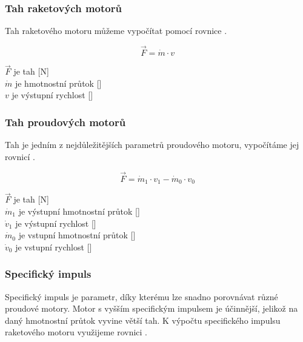\subsubsection{Tah raketových motorů}
{Tah raketového motoru můžeme vypočítat pomocí rovnice .}
\cite{NASA:propulsionIndex}

\begin{equation}\label{rv:RaketovyMotorTah}
    \vec{F}=\dot{m}\cdot{v}
\end{equation}

{\(\vec{F}\) je tah [N]}\\
{\(\dot{m}\) je hmotnostní průtok [\kgs]}\\
{\(v\) je výstupní rychlost [\ms]}\\

\subsubsection{Tah proudových motorů}
{Tah je jedním z nejdůležitějších parametrů proudového motoru, vypočítáme jej rovnicí .}
\cite{NASA:propulsionIndex}

\begin{equation}\label{rv:ProudovyMotorTah}
    \vec{F}=\dot{m}_{1}\cdot{v_1}-\dot{m}_{0}\cdot{v_0}
\end{equation}

{\(\vec{F}\) je tah [N]}\\
{\(\dot{m}_{1}\) je výstupní hmotnostní průtok [\kgs]}\\
{\(\dot{v}_{1}\) je výstupní rychlost [\ms]}\\
{\(\dot{m}_{0}\) je vstupní hmotnostní průtok [\kgs]}\\
{\(\dot{v}_{0}\) je vstupní rychlost [\ms]}

\subsubsection{Specifický impuls}
{Specifický impuls je parametr, díky kterému lze snadno porovnávat různé proudové motory. Motor s vyšším specifickým impulsem je účinnější, jelikož na daný hmotnostní průtok vyvine větší tah. K výpočtu specifického impulsu raketového motoru využijeme rovnici .}
\cite{NASA:propulsionIndex}

